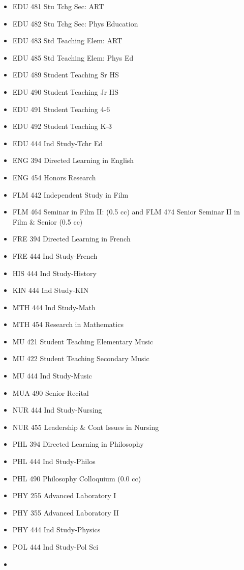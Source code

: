 \documentclass[
  letterpaper,
]{scrbook}
\begin{document}
\begin{itemize}
\item
  EDU 481 Stu Tchg Sec: ART
\item
  EDU 482 Stu Tchg Sec: Phys Education
\item
  EDU 483 Std Teaching Elem: ART
\item
  EDU 485 Std Teaching Elem: Phys Ed
\item
  EDU 489 Student Teaching Sr HS
\item
  EDU 490 Student Teaching Jr HS
\item
  EDU 491 Student Teaching 4-6
\item
  EDU 492 Student Teaching K-3
\item
  EDU 444 Ind Study-Tchr Ed
\item
  ENG 394 Directed Learning in English
\item
  ENG 454 Honors Research
\item
  FLM 442 Independent Study in Film
\item
  FLM 464 Seminar in Film II: (0.5 cc) and FLM 474 Senior Seminar II in
  Film \& Senior (0.5 cc)
\item
  FRE 394 Directed Learning in French
\item
  FRE 444 Ind Study-French
\item
  HIS 444 Ind Study-History
\item
  KIN 444 Ind Study-KIN
\item
  MTH 444 Ind Study-Math
\item
  MTH 454 Research in Mathematics
\item
  MU 421 Student Teaching Elementary Music
\item
  MU 422 Student Teaching Secondary Music
\item
  MU 444 Ind Study-Music
\item
  MUA 490 Senior Recital
\item
  NUR 444 Ind Study-Nursing
\item
  NUR 455 Leadership \& Cont Issues in Nursing
\item
  PHL 394 Directed Learning in Philosophy
\item
  PHL 444 Ind Study-Philos
\item
  PHL 490 Philosophy Colloquium (0.0 cc)
\item
  PHY 255 Advanced Laboratory I
\item
  PHY 355 Advanced Laboratory II
\item
  PHY 444 Ind Study-Physics
\item
  POL 444 Ind Study-Pol Sci
\item

\end{itemize}
\end{document}
